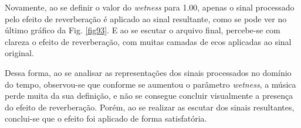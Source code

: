 


Novamente, ao se definir o valor do \textit{wetness} para 1.00, apenas o sinal processado pelo efeito de reverberação é aplicado ao sinal resultante, como se pode ver no último gráfico da Fig. \ref{fig93}. E ao se escutar o arquivo final, percebe-se com clareza o efeito de reverberação, com muitas camadas de ecos aplicadas ao sinal original.


Dessa forma, ao se analisar as representações dos sinais processados no domínio do tempo, observou-se que conforme se aumentou o parâmetro \textit{wetness}, a música perde muita da sua definição, e não se consegue concluir visualmente a presença do efeito de reverberação. Porém, ao se realizar as escutar dos sinais resultantes, conclui-se que o efeito foi aplicado de forma satisfatória.